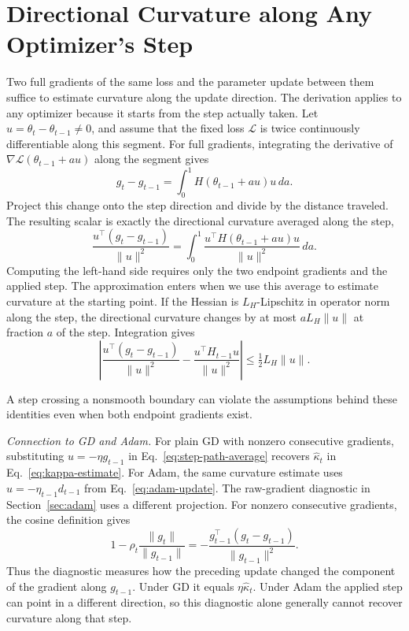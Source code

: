 \appendices
\section{Directional Curvature along Any Optimizer's Step}
\label{app:math}

Two full gradients of the same loss and the parameter update between them suffice to estimate curvature along the update direction. The derivation applies to any optimizer because it starts from the step actually taken. Let $u=\theta_t-\theta_{t-1}\ne 0$, and assume that the fixed loss $\mathcal L$ is twice continuously differentiable along this segment. For full gradients, integrating the derivative of $\nabla\mathcal L(\theta_{t-1}+au)$ along the segment gives
\begin{equation}
 g_t-g_{t-1}=\int_0^1 H(\theta_{t-1}+au)u\,da.
 \label{eq:app-gradient-integral}
\end{equation}
Project this change onto the step direction and divide by the distance traveled. The resulting scalar is exactly the directional curvature averaged along the step,
\begin{equation}
 \frac{u^\top(g_t-g_{t-1})}{\|u\|^2}
 =\int_0^1\frac{u^\top H(\theta_{t-1}+au)u}{\|u\|^2}\,da.
 \label{eq:step-path-average}
\end{equation}
Computing the left-hand side requires only the two endpoint gradients and the applied step. The approximation enters when we use this average to estimate curvature at the starting point. If the Hessian is $L_H$-Lipschitz in operator norm along the step, the directional curvature changes by at most $aL_H\|u\|$ at fraction $a$ of the step. Integration gives
\begin{equation}
 \left|\frac{u^\top(g_t-g_{t-1})}{\|u\|^2}
       -\frac{u^\top H_{t-1}u}{\|u\|^2}\right|
 \le \tfrac12 L_H\|u\|.
 \label{eq:app-curvature-bound}
\end{equation}

A step crossing a nonsmooth boundary can violate the assumptions behind these identities even when both endpoint gradients exist.

\emph{Connection to GD and Adam.} For plain GD with nonzero consecutive gradients, substituting $u=-\eta g_{t-1}$ in Eq.~\eqref{eq:step-path-average} recovers $\widehat\kappa_t$ in Eq.~\eqref{eq:kappa-estimate}. For Adam, the same curvature estimate uses $u=-\eta_{t-1}d_{t-1}$ from Eq.~\eqref{eq:adam-update}. The raw-gradient diagnostic in Section~\ref{sec:adam} uses a different projection. For nonzero consecutive gradients, the cosine definition gives
\begin{equation}
 1-\rho_t\frac{\|g_t\|}{\|g_{t-1}\|}
 =-\frac{g_{t-1}^{\top}(g_t-g_{t-1})}{\|g_{t-1}\|^2}.
 \label{eq:adam-projected-response}
\end{equation}
Thus the diagnostic measures how the preceding update changed the component of the gradient along $g_{t-1}$. Under GD it equals $\eta\widehat\kappa_t$. Under Adam the applied step can point in a different direction, so this diagnostic alone generally cannot recover curvature along that step.

